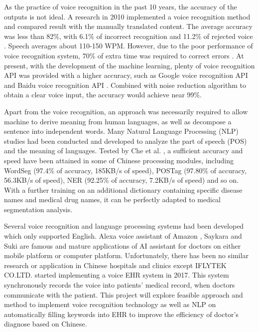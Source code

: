 \documentclass[12pt, a4paper, twoside]{extarticle}
\begin{document}
As the practice of voice recognition in the past 10 years, the accuracy of the outputs is not ideal. A research in 2010 implemented a voice recognition method and compared result with the manually translated content. The average accuracy was less than 82\%, with 6.1\% of incorrect recognition and 11.2\% of rejected voice \cite{doyle2010determining}. Speech averages about 110-150 WPM. However, due to the poor performance of voice recognition system, 70\% of extra time was required to correct errors \cite{kumah2018electronic}. At present, with the development of the machine learning, plenty of voice recognition API was provided with a higher accuracy, such as Google voice recognition API \cite{GoogleAPI} and Baidu voice recognition API \cite{BaiduAPI}. Combined with noise reduction algorithm to obtain a clear voice input, the accuracy would achieve near 99\%.

Apart from the voice recognition, an approach was necessarily required to allow machine to derive meaning from human languages, as well as decompose a sentence into independent words. Many Natural Language Processing (NLP) studies had been conducted and developed to analyze the part of speech (POS) and the meaning of languages. Tested by Che et al. \cite{che2010ltp}, a sufficient accuracy and speed have been attained in some of Chinese processing modules, including WordSeg (97.4\% of accuracy, 185KB/s of speed), POSTag (97.80\% of accuracy, 56.3KB/s of speed), NER (92.25\% of accuracy, 7.2KB/s of speed) and so on. With a further training on an additional dictionary containing specific disease names and medical drug names, it can be perfectly adapted to medical segmentation analysis.

Several voice recognition and language processing systems had been developed which only supported English. Alexa voice assistant of Amazon \cite{Alexa}, Saykara \cite{Saykara} and Suki \cite{Suki} are famous and mature applications of AI assistant for doctors on either mobile platform or computer platform. Unfortunately, there has been no similar research or application in Chinese hospitals and clinics except IFLYTEK CO.LTD. \cite{Iflytek} started implementing a voice EHR system in 2017. This system synchronously records the voice into patients' medical record, when doctors communicate with the patient. This project will explore feasible approach and method to implement voice recognition technology as well as NLP on automatically filling keywords into EHR to improve the efficiency of doctor’s diagnose based on Chinese.
\end{document}
